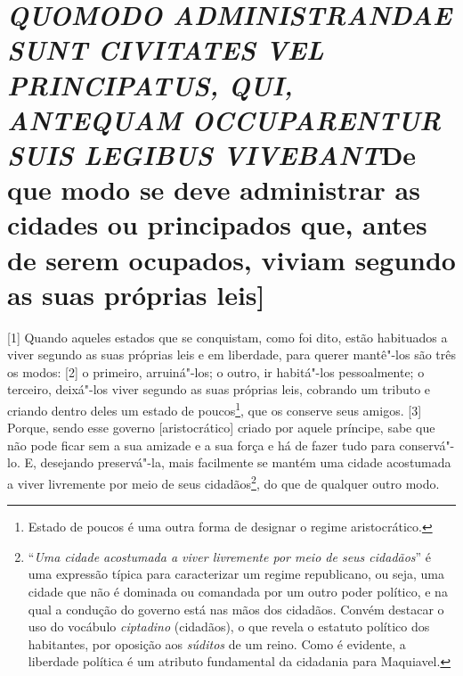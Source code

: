 \quebra\section{\emph{QUOMODO ADMINISTRANDAE SUNT CIVITATES VEL PRINCIPATUS, QUI,
ANTEQUAM OCCUPARENTUR SUIS LEGIBUS VIVEBANT}\break {[}De que modo se deve administrar as cidades ou principados que, antes de serem ocupados, viviam segundo as suas próprias leis{]}}

{[}1{]} Quando aqueles estados que se conquistam, como foi dito, estão
habituados a viver segundo as suas próprias leis e em liberdade, para
querer mantê"-los são três os modos: {[}2{]} o primeiro, arruiná"-los; o
outro, ir habitá"-los pessoalmente; o terceiro, deixá"-los viver segundo
as suas próprias leis, cobrando um tributo e criando dentro deles um
estado de poucos\footnote{Estado de poucos é uma outra forma de designar
  o regime aristocrático.}, que os conserve seus amigos. {[}3{]} Porque,
sendo esse governo {[}aristocrático{]} criado por aquele príncipe, sabe
que não pode ficar sem a sua amizade e a sua força e há de fazer tudo
para conservá"-lo. E, desejando preservá"-la, mais facilmente se mantém
uma cidade acostumada a viver livremente por meio de seus
cidadãos\footnote{``\emph{Uma cidade acostumada a viver livremente por
  meio de seus cidadãos}'' é uma expressão típica para caracterizar um
  regime republicano, ou seja, uma cidade que não é dominada ou
  comandada por um outro poder político, e na qual a condução do governo
  está nas mãos dos cidadãos. Convém destacar o uso do vocábulo
  \emph{ciptadino} (cidadãos), o que revela o estatuto político dos
  habitantes, por oposição aos \emph{súditos} de um reino. Como é
  evidente, a liberdade política é um atributo fundamental da cidadania
  para Maquiavel.}, do que de qualquer outro modo.

